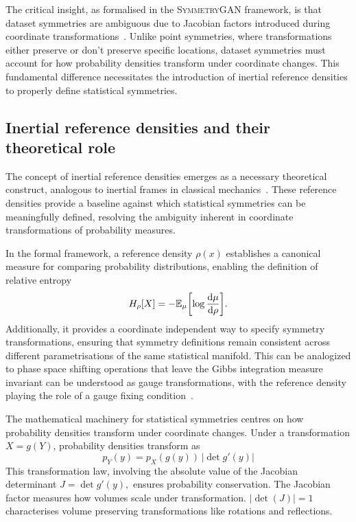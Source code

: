         The critical insight, as formalised in the \textsc{SymmetryGAN} framework, is that dataset symmetries are ambiguous due to Jacobian factors introduced during coordinate transformations~\cite{jacobi_determinantibus_1841}.
        Unlike point symmetries, where transformations either preserve or don't preserve specific locations, dataset symmetries must account for how probability densities transform under coordinate changes.
        This fundamental difference necessitates the introduction of inertial reference densities to properly define statistical symmetries.
        
    \subsection{Inertial reference densities and their theoretical role}
        The concept of inertial reference densities emerges as a necessary theoretical construct, analogous to inertial frames in classical mechanics~\cite{noauthor_classical_1980, noauthor_philosophiae_1687, Einstein:1916vd}.
        These reference densities provide a baseline against which statistical symmetries can be meaningfully defined, resolving the ambiguity inherent in coordinate transformations of probability measures.

        In the formal framework, a reference density \(\rho(x)\) establishes a canonical measure for comparing probability distributions, enabling the definition of relative entropy
        \[
            H_\rho[X] = -\mathbb{E}_\mu\qty[\log\frac{\dd\mu}{\dd\rho}].
        \]
        Additionally, it provides a coordinate independent way to specify symmetry transformations, ensuring that symmetry definitions remain consistent across different parametrisations of the same statistical manifold.
        This can be analogized to phase space shifting operations that leave the Gibbs integration measure invariant can be understood as gauge transformations, with the reference density playing the role of a gauge fixing condition~\cite{Muller:2024rlq}.
        
        The mathematical machinery for statistical symmetries centres on how probability densities transform under coordinate changes.
        Under a transformation \(X = g(Y)\), probability densities transform as
            \[
                p_Y(y) = p_X(g(y))\,|\det g'(y) |
            \]
        This transformation law, involving the absolute value of the Jacobian determinant \(J = \det g'(y),\) ensures probability conservation.
        The Jacobian factor measures how volumes scale under transformation.
        \(|\det(J)| = 1\) characterises volume preserving transformations like rotations and reflections.

